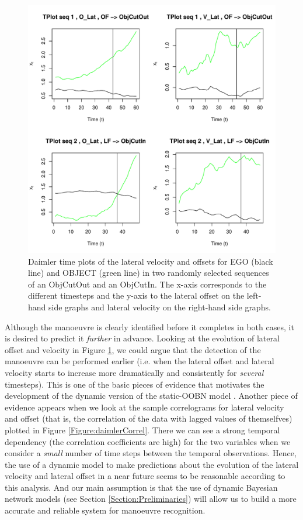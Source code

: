 \begin{figure}
\begin{center}
\includegraphics[scale=0.65]{./figures/DaimlerLE_EGO_L_LE_OBJ_R_OBJCut.pdf}
\caption{\label{Figure:daimlerTPlot}Daimler time plots of the lateral velocity and offsets for EGO (black line) and OBJECT (green line) in two randomly selected sequences of an ObjCutOut and an ObjCutIn. The x-axis corresponds to the different timesteps and the y-axis to the lateral offset on the left-hand side graphs and lateral velocity on the right-hand side graphs.}
\end{center}
\end{figure}


Although the manoeuvre is clearly identified before it completes in both cases, it is desired to predict it \textit{further} in advance. Looking at the evolution of lateral offset and velocity in Figure \ref{Figure:daimlerTPlot}, we could argue that the detection of the manoeuvre can be performed earlier (i.e. when the lateral offset and lateral velocity starts to increase more dramatically and consistently for \textit{several} timesteps). This is one of the basic pieces of evidence that motivates the development of the dynamic version of the static-OOBN model \cite{Weidl2014}.  Another piece of evidence appears when we look at the sample correlograms for lateral velocity and offset (that is, the correlation of the data with lagged values of themselfves) plotted in Figure \ref{Figure:daimlerCorrel}. There we can see a strong temporal dependency (the correlation coefficients are high) for the two variables when we consider a \textit{small} number of time steps between the temporal observations. Hence, the use of a dynamic model to make predictions about the evolution of the lateral velocity and lateral offset in a near future seems to be reasonable according to this analysis. And our main assumption is that the use of dynamic Bayesian network models (see Section \ref{Section:Preliminaries}) will allow us to build a more accurate and reliable system for manoeuvre recognition. 

